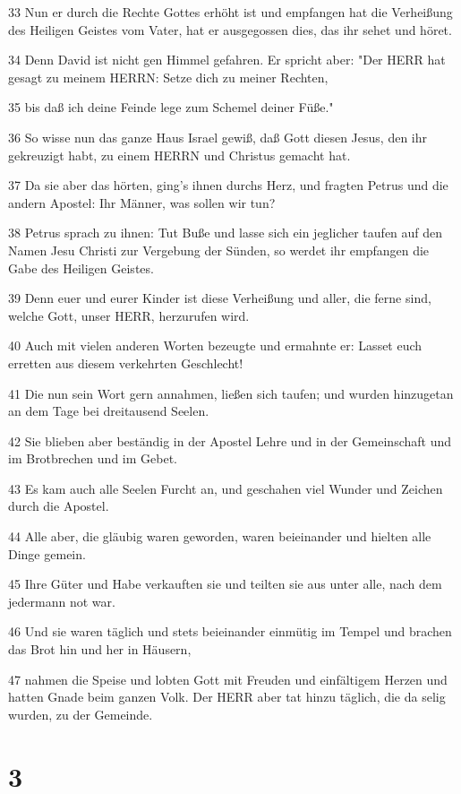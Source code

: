 \par 33 Nun er durch die Rechte Gottes erhöht ist und empfangen hat die Verheißung des Heiligen Geistes vom Vater, hat er ausgegossen dies, das ihr sehet und höret.
\par 34 Denn David ist nicht gen Himmel gefahren. Er spricht aber: "Der HERR hat gesagt zu meinem HERRN: Setze dich zu meiner Rechten,
\par 35 bis daß ich deine Feinde lege zum Schemel deiner Füße."
\par 36 So wisse nun das ganze Haus Israel gewiß, daß Gott diesen Jesus, den ihr gekreuzigt habt, zu einem HERRN und Christus gemacht hat.
\par 37 Da sie aber das hörten, ging's ihnen durchs Herz, und fragten Petrus und die andern Apostel: Ihr Männer, was sollen wir tun?
\par 38 Petrus sprach zu ihnen: Tut Buße und lasse sich ein jeglicher taufen auf den Namen Jesu Christi zur Vergebung der Sünden, so werdet ihr empfangen die Gabe des Heiligen Geistes.
\par 39 Denn euer und eurer Kinder ist diese Verheißung und aller, die ferne sind, welche Gott, unser HERR, herzurufen wird.
\par 40 Auch mit vielen anderen Worten bezeugte und ermahnte er: Lasset euch erretten aus diesem verkehrten Geschlecht!
\par 41 Die nun sein Wort gern annahmen, ließen sich taufen; und wurden hinzugetan an dem Tage bei dreitausend Seelen.
\par 42 Sie blieben aber beständig in der Apostel Lehre und in der Gemeinschaft und im Brotbrechen und im Gebet.
\par 43 Es kam auch alle Seelen Furcht an, und geschahen viel Wunder und Zeichen durch die Apostel.
\par 44 Alle aber, die gläubig waren geworden, waren beieinander und hielten alle Dinge gemein.
\par 45 Ihre Güter und Habe verkauften sie und teilten sie aus unter alle, nach dem jedermann not war.
\par 46 Und sie waren täglich und stets beieinander einmütig im Tempel und brachen das Brot hin und her in Häusern,
\par 47 nahmen die Speise und lobten Gott mit Freuden und einfältigem Herzen und hatten Gnade beim ganzen Volk. Der HERR aber tat hinzu täglich, die da selig wurden, zu der Gemeinde.

\chapter{3}


